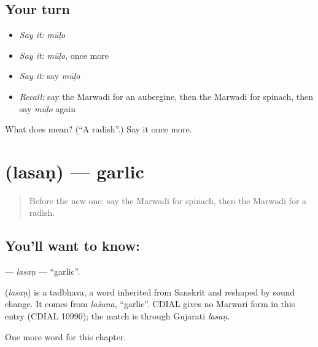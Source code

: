 \subsection*{Your turn}
\begin{itemize}
\raggedright
  \item \emph{Say it:} \emph{mūḷo}
  \item \emph{Say it:} \emph{mūḷo}, once more
  \item \emph{Say it:} say \emph{mūḷo}
  \item \emph{Recall:} say the Marwadi for an aubergine, then the Marwadi for spinach, then say \emph{mūḷo} again
\end{itemize}

\begin{tcolorbox}[breakable,colback=teal!4,colframe=teal!35!black,title={Before you move on}]
What does  mean? (\textquotedblleft{}A radish\textquotedblright{}.) Say it once more.
\end{tcolorbox}
\section[\texorpdfstring{\mw{लसण} (lasaṇ)}{लसण (lasaṇ)}]{ (lasaṇ) — garlic}

\label{lesson:MW-C136-lasan}



\begin{quote}
Before the new one: say the Marwadi for spinach, then the Marwadi for a radish.
\end{quote}

\subsection*{You'll want to know: }
\textbf{} — \emph{lasaṇ} — \textquotedblleft{}garlic\textquotedblright{}.

\begin{cousinweb}
\textbf{} (\emph{lasaṇ}) is a tadbhava, a word inherited from Sanskrit and reshaped by sound change. It comes from \emph{laśuna}, \textquotedblleft{}garlic\textquotedblright{}. CDIAL gives no Marwari form in this entry (CDIAL 10990); the match is through Gujarati \emph{lasaṇ}.
\end{cousinweb}

\begin{grammarlens}[title={What you've built}]
One more word for this chapter.
\end{grammarlens}


